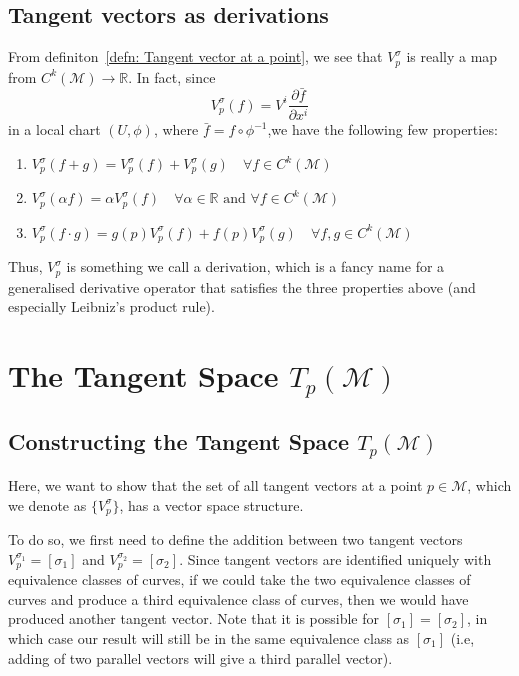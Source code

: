     \subsection{Tangent vectors as derivations}
      From definiton~\ref{defn: Tangent vector at a point}, we see that
      $V_p^\sigma$ is really a map from $C^k(\mathcal{M}) \rightarrow
      \mathbb{R}$. In fact, since
      \[V_p^\sigma(f) = V^i \frac{\partial\bar{f}}{\partial x^i}\]
      in a local chart $(U,\phi)$, where $\bar{f} = f\circ \phi^{-1}$,we
      have the following few properties:
      \begin{enumerate}
        \item{$V_p^\sigma(f+g) = V_p^\sigma(f) + V_p^\sigma(g) \quad
        \forall f \in C^k(\mathcal{M})$}
        \item{$V_p^\sigma(\alpha f) = \alpha V_p^\sigma(f) \quad \forall
        \alpha\in\mathbb{R} \text{ and } \forall f \in C^k(\mathcal{M})$}
        \item{$V_p^\sigma(f\cdot g) = g(p)V_p^\sigma(f) + f(p)V_p^\sigma(g)
        \quad \forall f,g\in C^k(\mathcal{M})$}
      \end{enumerate}
      Thus, $V^\sigma_p$ is something we call a derivation, which is a
      fancy name for a generalised derivative operator that satisfies the
      three properties above (and especially Leibniz's product rule).
  \section{The Tangent Space \texorpdfstring{$T_p(\mathcal{M})$}{Tp(M)}}
    \subsection{Constructing the Tangent Space $T_p(\mathcal{M})$}
      Here, we want to show that the set of all tangent vectors at a point
      $p\in \mathcal{M}$, which we denote as $\{V_p^\sigma\}$, has a vector
      space structure. 

      To do so, we first need to define the addition between two tangent
      vectors $V^{\sigma_1}_p = [\sigma_1]$ and $V^{\sigma_2}_p =
      [\sigma_2]$. Since tangent vectors are identified uniquely with
      equivalence classes of curves, if we could take the two equivalence
      classes of curves and produce a third equivalence class of curves, then
      we would have produced another tangent vector. Note that it is possible
      for $[\sigma_1] = [\sigma_2]$, in which case our result will still be
      in the same equivalence class as $[\sigma_1]$ (i.e, adding of two
      parallel vectors will give a third parallel vector).

